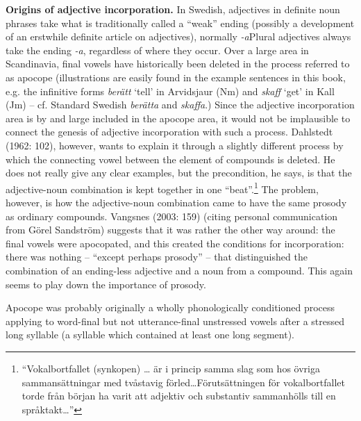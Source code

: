 \textbf{Origins of adjective incorporation.} In Swedish, adjectives in definite noun phrases take what is traditionally called a “weak” ending (possibly a development of an erstwhile definite article on adjectives), normally\textit{ {}-a}Plural adjectives always take the ending\textit{ {}-a}, regardless of where they occur. Over a large area in Scandinavia, final vowels have historically been deleted in the process referred to as apocope (illustrations are easily found in the example sentences in this book, e.g. the infinitive forms \textit{berätt} ‘tell’ in Arvidsjaur (Nm) and \textit{skaff} ‘get’ in Kall (Jm) – cf. Standard Swedish \textit{berätta} and \textit{skaffa}.) Since the adjective incorporation area is by and large included in the apocope area, it would not be implausible to connect the genesis of adjective incorporation with such a process. Dahlstedt (1962: 102), however, wants to explain it through a slightly different process by which the connecting vowel between the element of compounds is deleted. He does not really give any clear examples, but the precondition, he says, is that the adjective-noun combination is kept together in one “beat”.\footnote{ “Vokalbortfallet (synkopen) … är i princip samma slag som hos övriga sammansättningar med tvåstavig förled…Förutsättningen för vokalbortfallet torde från början ha varit att adjektiv och substantiv sammanhölls till en språktakt…”} The problem, however, is how the adjective-noun combination came to have the same prosody as ordinary compounds. Vangsnes (2003: 159) (citing personal communication from Görel Sandström) suggests that it was rather the other way around: the final vowels were apocopated, and this created the conditions for incorporation: there was nothing – “except perhaps prosody” – that distinguished the combination of an ending-less adjective and a noun from a compound. This again seems to play down the importance of prosody.

Apocope was probably originally a wholly phonologically conditioned process applying to word-final but not utterance-final unstressed vowels after a stressed long syllable (a syllable which contained at least one long segment).

